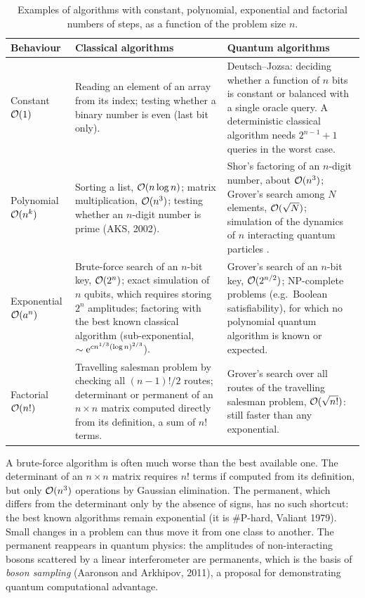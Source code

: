 \begin{table}[h]\centering\small
\begin{tabularx}{\textwidth}{@{}l>{\raggedright\arraybackslash}X>{\raggedright\arraybackslash}X@{}}\toprule
Behaviour & Classical algorithms & Quantum algorithms\\ \midrule
Constant $\mathcal O(1)$ & Reading an element of an array from its index; testing whether a binary number is even (last bit only). &
Deutsch--Jozsa: deciding whether a function of $n$ bits is constant or balanced with a single oracle query. A deterministic classical algorithm needs $2^{n-1}+1$ queries in the worst case.\\[1ex]
Polynomial $\mathcal O(n^k)$ & Sorting a list, $\mathcal O(n\log n)$; matrix multiplication, $\mathcal O(n^3)$; testing whether an $n$-digit number is prime (AKS, 2002). &
Shor's factoring of an $n$-digit number, about $\mathcal O(n^3)$; Grover's search among $N$ elements, $\mathcal O(\sqrt N)$; simulation of the dynamics of $n$ interacting quantum particles \cite{Lloyd1996}.\\[1ex]
Exponential $\mathcal O(a^n)$ & Brute-force search of an $n$-bit key, $\mathcal O(2^n)$; exact simulation of $n$ qubits, which requires storing $2^n$ amplitudes; factoring with the best known classical algorithm
(sub-exponential, $\sim\mathrm e^{cn^{1/3}(\log n)^{2/3}}$). & Grover's search of an $n$-bit key, $\mathcal O(2^{n/2})$; NP-complete problems (e.g.\ Boolean satisfiability), for which no polynomial quantum algorithm is known or expected.\\[1ex]
Factorial $\mathcal O(n!)$ & Travelling salesman problem by checking all $(n-1)!/2$ routes; determinant or permanent of an $n\times n$ matrix computed directly from its definition, a sum of $n!$ terms. &
Grover's search over all routes of the travelling salesman problem, $\mathcal O(\sqrt{n!})$: still faster than any exponential.\\ \bottomrule
\end{tabularx}
\caption{Examples of algorithms with constant, polynomial, exponential and factorial numbers of steps, as a function of the problem size $n$.}\label{tab:complexity}
\end{table}

A brute-force algorithm is often much worse than the best available one. The determinant of an $n\times n$ matrix requires $n!$ terms if computed from its definition, but only $\mathcal O(n^3)$ operations by Gaussian
elimination. The permanent, which differs from the determinant only by the absence of signs, has no such shortcut: the best known algorithms remain exponential (it is \#P-hard, Valiant 1979). Small changes in a
problem can thus move it from one class to another. The permanent reappears in quantum physics: the amplitudes of non-interacting bosons scattered by a linear interferometer are permanents, which is the basis of
\emph{boson sampling} (Aaronson and Arkhipov, 2011), a proposal for demonstrating quantum computational advantage.

